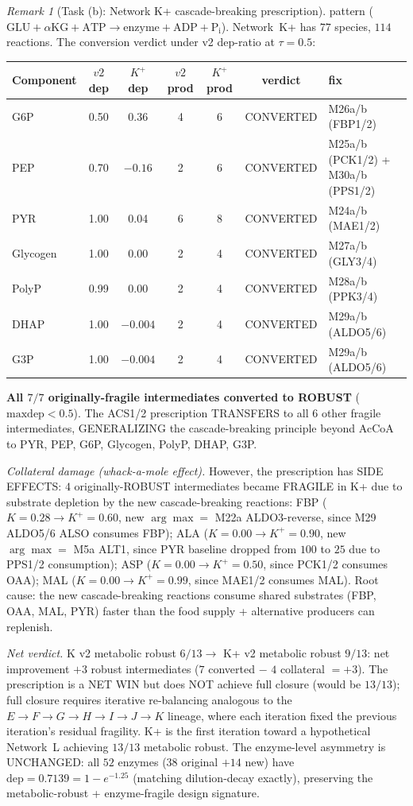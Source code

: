 \documentclass[11pt,a4paper]{article}
\theoremstyle{plain}
\theoremstyle{definition}
\theoremstyle{remark}
\newtheorem{remark}[theorem]{Remark}
\begin{document}
\begin{remark}[Task (b): Network K+ cascade-breaking prescription]
pattern ($\mathrm{GLU} + \alpha\mathrm{KG} + \mathrm{ATP} \to
\mathrm{enzyme} + \mathrm{ADP} + \mathrm{P_i}$). Network~K+ has $77$
species, $114$ reactions. The conversion verdict under v2 dep-ratio at
$\tau = 0.5$:
\begin{center}
\begin{tabular}{lcccccp{3.5cm}}
\toprule
Component & $v2$ dep & $K^+$ dep & $v2$ prod & $K^+$ prod & verdict & fix \\
\midrule
G6P & 0.50 & 0.36 & 4 & 6 & CONVERTED & M26a/b (FBP1/2) \\
PEP & 0.70 & $-0.16$ & 2 & 6 & CONVERTED & M25a/b (PCK1/2) + M30a/b (PPS1/2) \\
PYR & 1.00 & 0.04 & 6 & 8 & CONVERTED & M24a/b (MAE1/2) \\
Glycogen & 1.00 & 0.00 & 2 & 4 & CONVERTED & M27a/b (GLY3/4) \\
PolyP & 0.99 & 0.00 & 2 & 4 & CONVERTED & M28a/b (PPK3/4) \\
DHAP & 1.00 & $-0.004$ & 2 & 4 & CONVERTED & M29a/b (ALDO5/6) \\
G3P & 1.00 & $-0.004$ & 2 & 4 & CONVERTED & M29a/b (ALDO5/6) \\
\bottomrule
\end{tabular}
\end{center}
\textbf{All $7/7$ originally-fragile intermediates converted to ROBUST}
($\mathrm{maxdep} < 0.5$). The ACS1/2 prescription TRANSFERS to all $6$ other
fragile intermediates, GENERALIZING the cascade-breaking principle
beyond AcCoA to PYR, PEP, G6P, Glycogen, PolyP, DHAP, G3P.

\medskip
\emph{Collateral damage (whack-a-mole effect).} However, the
prescription has SIDE EFFECTS: $4$ originally-ROBUST intermediates
became FRAGILE in K+ due to substrate depletion by the new
cascade-breaking reactions: FBP ($K = 0.28 \to K^+ = 0.60$, new
$\arg\max = $ M22a ALDO3-reverse, since M29 ALDO5/6 ALSO consumes FBP);
ALA ($K = 0.00 \to K^+ = 0.90$, new $\arg\max = $ M5a ALT1, since PYR
baseline dropped from $100$ to $25$ due to PPS1/2 consumption); ASP
($K = 0.00 \to K^+ = 0.50$, since PCK1/2 consumes OAA); MAL ($K = 0.00
\to K^+ = 0.99$, since MAE1/2 consumes MAL). Root cause: the new
cascade-breaking reactions consume shared substrates (FBP, OAA, MAL,
PYR) faster than the food supply + alternative producers can replenish.

\medskip
\emph{Net verdict.} K v2 metabolic robust $6/13 \to$ K+ v2 metabolic
robust $9/13$: net improvement $+3$ robust intermediates ($7$
converted $-$ $4$ collateral $= +3$). The prescription is a NET WIN
but does NOT achieve full closure (would be $13/13$); full closure
requires iterative re-balancing analogous to the
$E \to F \to G \to H \to I \to J \to K$ lineage, where each iteration
fixed the previous iteration's residual fragility. K+ is the first
iteration toward a hypothetical Network~L achieving $13/13$ metabolic
robust. The enzyme-level asymmetry is UNCHANGED: all $52$ enzymes
($38$ original $+ 14$ new) have $\mathrm{dep} = 0.7139 = 1 - e^{-1.25}$
(matching dilution-decay exactly), preserving the
metabolic-robust + enzyme-fragile design signature.
\end{remark}
\end{document}
